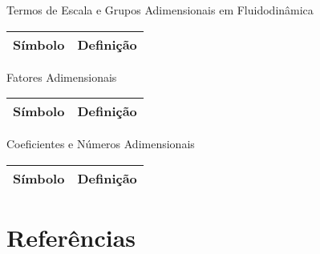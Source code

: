     \begin{frame}{Termos de Escala e Grupos Adimensionais em Fluidodinâmica}\vspace*{-1em}
        \setlength{\tabcolsep}{2mm}
        \noindent\begin{longtable}{cp{110mm}}
            \alert{Símbolo} & \alert{Definição} \\
            \hline
            \hline
        \end{longtable}
    \end{frame}

    \begin{frame}{Fatores Adimensionais}\vspace*{-1em}
        \setlength{\tabcolsep}{2mm}
        \noindent\begin{longtable}{cp{110mm}}
            \alert{Símbolo} & \alert{Definição} \\
            \hline
            \hline
        \end{longtable}
    \end{frame}

    \begin{frame}{Coeficientes e Números Adimensionais}\vspace*{-1em}
        \setlength{\tabcolsep}{2mm}
        \noindent\begin{longtable}{cp{110mm}}
            \alert{Símbolo} & \alert{Definição} \\
            \hline
            \hline
        \end{longtable}
    \end{frame}


\section{Referências}

